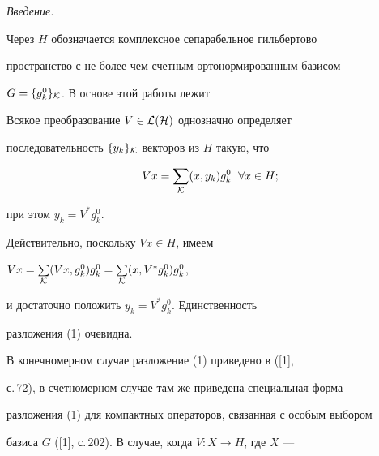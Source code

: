 

\maketitle 


\label{begin} 


 


{\it Введение.} 


Через $H$ обозначается комплексное сепарабельное гильбертово 


пространство с не более чем счетным ортонормированным базисом 


$G=\{g^0_k\}_{\cal K}$. В основе этой работы лежит 


 


\begin{prop} 


Всякое преобразование $V\in\cal L(H)$ однозначно определяет 


последовательность $\{y_k\}_{\cal K}$ векторов из $H$ такую, что 


\begin{equation} 


V x=\sum_{\cal K}(x,y_k)g^0_k\ \; \forall x\in H; 


\end{equation} 


при этом $y_k=V^*g^0_k$. 


\end{prop} 


 


Действительно, поскольку $V x\in H$, имеем 


$V x=\sum\limits_{\cal K}(V x,g^0_k)g^0_k= 


\sum\limits_{\cal K}(x,V^*g^0_k)g^0_k$, 


и достаточно положить $y_k=V^*g^0_k$. Единственность 


разложения (1) очевидна. 


 


В конечномерном случае разложение (1) приведено в ([1], 


с.\,72), в счетномерном случае там же приведена специальная форма 


разложения (1) для компактных операторов, связанная с особым выбором 


базиса $G$ ([1], с.\,202). В случае, когда $V:X\to H$, где $X$ --- 


